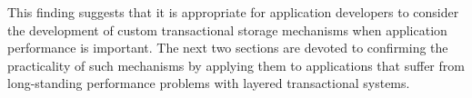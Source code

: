\documentclass[10pt,letterpaper,twocolumn,english]{article}
\begin{document}
This finding suggests that it is appropriate for
application developers to consider the development of custom
transactional storage mechanisms when application performance is
important.  The next two sections are devoted to confirming the 
practicality of such mechanisms by applying them to applications 
that suffer from long-standing performance problems with layered 
transactional systems.


\end{document}
